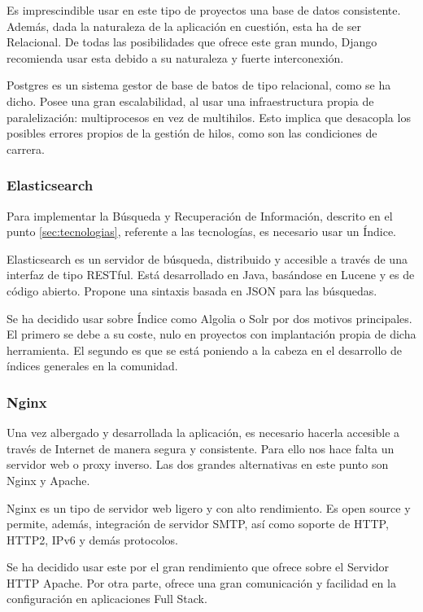 Es imprescindible usar en este tipo de proyectos una base de datos consistente. Además, dada la naturaleza de la aplicación en cuestión, esta ha de ser Relacional. De todas las posibilidades que ofrece este gran mundo, Django recomienda usar esta debido a su naturaleza y fuerte interconexión.

Postgres es un sistema gestor de base de batos de tipo relacional, como se ha dicho. Posee una gran escalabilidad, al usar una infraestructura propia de paralelización: multiprocesos en vez de multihilos. Esto implica que desacopla los posibles errores propios de la gestión de hilos, como son las condiciones de carrera.

\subsubsection{Elasticsearch}

Para implementar la Búsqueda y Recuperación de Información, descrito en el punto \ref{sec:tecnologias}, referente a las tecnologías, es necesario usar un Índice.

Elasticsearch es un servidor de búsqueda, distribuido y accesible a través de una interfaz de tipo RESTful. Está desarrollado en Java, basándose en Lucene y es de código abierto. Propone una sintaxis basada en JSON para las búsquedas.

Se ha decidido usar sobre Índice como Algolia o Solr por dos motivos principales. El primero se debe a su coste, nulo en proyectos con implantación propia de dicha herramienta. El segundo es que se está poniendo a la cabeza en el desarrollo de índices generales en la comunidad.

\subsubsection{Nginx}

Una vez albergado y desarrollada la aplicación, es necesario hacerla accesible a través de Internet de manera segura y consistente. Para ello nos hace falta un servidor web o proxy inverso. Las dos grandes alternativas en este punto son Nginx y Apache.

Nginx es un tipo de servidor web ligero y con alto rendimiento. Es open source y permite, además, integración de servidor SMTP, así como soporte de HTTP, HTTP2, IPv6 y demás protocolos.

Se ha decidido usar este por el gran rendimiento que ofrece sobre el Servidor HTTP Apache. Por otra parte, ofrece una gran comunicación y facilidad en la configuración en aplicaciones Full Stack.

